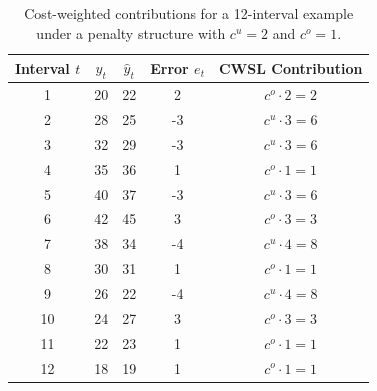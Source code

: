 \begin{table}[h!]
\centering
\begin{tabular}{c c c c c}
\toprule
Interval $t$ & $y_t$ & $\hat{y}_t$ & Error $e_t$ & CWSL Contribution \\
\midrule
1  & 20 & 22 &  \phantom{-}2 & $c^o \cdot 2 = 2$ \\
2  & 28 & 25 & -3            & $c^u \cdot 3 = 6$ \\
3  & 32 & 29 & -3            & $c^u \cdot 3 = 6$ \\
4  & 35 & 36 &  \phantom{-}1 & $c^o \cdot 1 = 1$ \\
5  & 40 & 37 & -3            & $c^u \cdot 3 = 6$ \\
6  & 42 & 45 &  \phantom{-}3 & $c^o \cdot 3 = 3$ \\
7  & 38 & 34 & -4            & $c^u \cdot 4 = 8$ \\
8  & 30 & 31 &  \phantom{-}1 & $c^o \cdot 1 = 1$ \\
9  & 26 & 22 & -4            & $c^u \cdot 4 = 8$ \\
10 & 24 & 27 &  \phantom{-}3 & $c^o \cdot 3 = 3$ \\
11 & 22 & 23 &  \phantom{-}1 & $c^o \cdot 1 = 1$ \\
12 & 18 & 19 &  \phantom{-}1 & $c^o \cdot 1 = 1$ \\
\bottomrule
\end{tabular}
\caption{Cost-weighted contributions for a 12-interval example under a
penalty structure with $c^u = 2$ and $c^o = 1$.}
\label{tab:cwsl_example}
\end{table}

